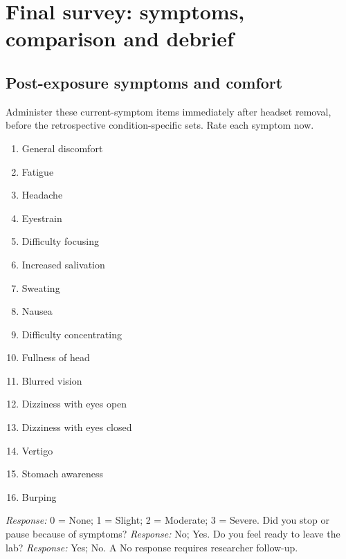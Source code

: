 \section{Final survey: symptoms, comparison and debrief}
\subsection{Post-exposure symptoms and comfort}
Administer these current-symptom items immediately after headset removal, before the retrospective condition-specific sets. Rate each symptom now.
\begin{enumerate}
\item General discomfort
\item Fatigue
\item Headache
\item Eyestrain
\item Difficulty focusing
\item Increased salivation
\item Sweating
\item Nausea
\item Difficulty concentrating
\item Fullness of head
\item Blurred vision
\item Dizziness with eyes open
\item Dizziness with eyes closed
\item Vertigo
\item Stomach awareness
\item Burping
\end{enumerate}
\textit{Response:} 0 = None; 1 = Slight; 2 = Moderate; 3 = Severe.
Did you stop or pause because of symptoms?
\textit{Response:} No; Yes.
Do you feel ready to leave the lab?
\textit{Response:} Yes; No. A No response requires researcher follow-up.
